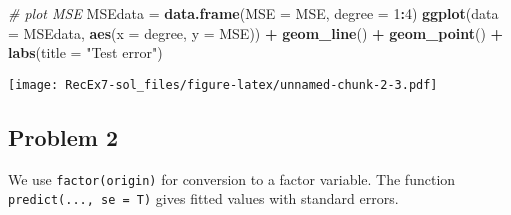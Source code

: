 \documentclass[]{article}
\newenvironment{Shaded}{\begin{snugshade}}{\end{snugshade}}
\newcommand{\KeywordTok}[1]{\textcolor[rgb]{0.13,0.29,0.53}{\textbf{#1}}}
\newcommand{\DataTypeTok}[1]{\textcolor[rgb]{0.13,0.29,0.53}{#1}}
\newcommand{\DecValTok}[1]{\textcolor[rgb]{0.00,0.00,0.81}{#1}}
\newcommand{\StringTok}[1]{\textcolor[rgb]{0.31,0.60,0.02}{#1}}
\newcommand{\CommentTok}[1]{\textcolor[rgb]{0.56,0.35,0.01}{\textit{#1}}}
\newcommand{\OperatorTok}[1]{\textcolor[rgb]{0.81,0.36,0.00}{\textbf{#1}}}
\newcommand{\NormalTok}[1]{#1}
\begin{document}
\begin{Shaded}
\begin{Highlighting}[]
\CommentTok{# plot MSE}
\NormalTok{MSEdata =}\StringTok{ }\KeywordTok{data.frame}\NormalTok{(}\DataTypeTok{MSE =}\NormalTok{ MSE, }\DataTypeTok{degree =} \DecValTok{1}\OperatorTok{:}\DecValTok{4}\NormalTok{)}
\KeywordTok{ggplot}\NormalTok{(}\DataTypeTok{data =}\NormalTok{ MSEdata, }\KeywordTok{aes}\NormalTok{(}\DataTypeTok{x =}\NormalTok{ degree, }\DataTypeTok{y =}\NormalTok{ MSE)) }\OperatorTok{+}\StringTok{ }\KeywordTok{geom_line}\NormalTok{() }\OperatorTok{+}\StringTok{ }\KeywordTok{geom_point}\NormalTok{() }\OperatorTok{+}\StringTok{ }
\StringTok{    }\KeywordTok{labs}\NormalTok{(}\DataTypeTok{title =} \StringTok{"Test error"}\NormalTok{)}
\end{Highlighting}
\end{Shaded}

\texttt{[image: RecEx7-sol\_files/figure-latex/unnamed-chunk-2-3.pdf]}

\subsection{Problem 2}\label{problem-2}

We use \texttt{factor(origin)} for conversion to a factor variable. The
function \texttt{predict(...,\ se\ =\ T)} gives fitted values with
standard errors.
\end{document}
